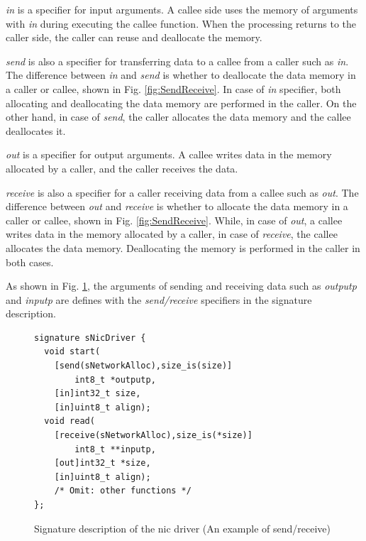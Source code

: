 \documentclass[conference]{IEEEtran/IEEEtran}
\begin{document}
{\it in} is a specifier for input arguments.
A callee side uses the memory of arguments with {\it in} during executing the callee function.
When the processing returns to the caller side, the caller can reuse and deallocate the memory.

{\it send} is also a specifier for transferring data to a callee from a caller such as {\it in}.
The difference between {\it in} and {\it send} is whether to deallocate the data memory in a caller or callee, shown in Fig. \ref{fig:SendReceive}.
In case of {\it in} specifier, both allocating and deallocating the data memory are performed in the caller.
On the other hand, in case of {\it send}, the caller allocates the data memory and the callee deallocates it.

{\it out} is a specifier for output arguments.
A callee writes data in the memory allocated by a caller, and the caller receives the data.

{\it receive} is also a specifier for a caller receiving data from a callee such as {\it out}.
The difference between {\it out} and {\it receive} is whether to allocate the data memory in a caller or callee, shown in Fig. \ref{fig:SendReceive}.
While, in case of {\it out}, a callee writes data in the memory allocated by a caller, in case of {\it receive}, the callee allocates the data memory.
Deallocating the memory is performed in the caller in both cases.

As shown in Fig. \ref{src:SendReceive}, the arguments of sending and receiving data such as {\it outputp} and {\it inputp} are defines with the {\it send/receive} specifiers in the signature description.

\begin{figure}[t]
\centering
\begin{lstlisting}
signature sNicDriver {
  void start(
    [send(sNetworkAlloc),size_is(size)]
        int8_t *outputp,
    [in]int32_t size,
    [in]uint8_t align);
  void read(
    [receive(sNetworkAlloc),size_is(*size)]
        int8_t **inputp,
    [out]int32_t *size,
    [in]uint8_t align);
    /* Omit: other functions */
};
\end{lstlisting}
\caption{Signature description of the nic driver (An example of send/receive)}
\label{src:SendReceive}
\end{figure}

\end{document}
